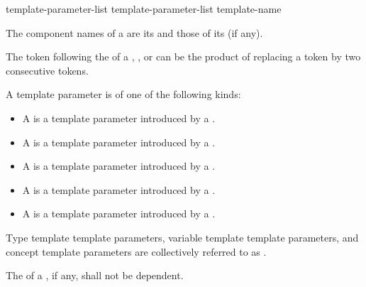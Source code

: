 \begin{bnf}
\br
   \terminal{<} template-parameter-list \terminal{>}   \br
   \terminal{<} template-parameter-list \terminal{>}   \terminal{=}  template-name
\end{bnf}

%
The component names of a  are
its  and
those of its  (if any).
\begin{note}
The \tcode{>} token following the
 of a
,
, or
can be the product of replacing a
\tcode{>>} token by two consecutive \tcode{>}
tokens.
\end{note}

\pnum
A template parameter is of one of the following kinds:
\begin{itemize}
\item
A  is
a template parameter introduced by a .
\item
A  is
a template parameter introduced by a .
\item
A  is
a template parameter introduced by a .
\item
A  is
a template parameter introduced by a .
\item
A  is
a template parameter introduced by a .
\end{itemize}

\pnum
Type template template parameters,
variable template template parameters, and
concept template parameters
are collectively referred to as .

\pnum
The  of a ,
if any, shall not be dependent.

